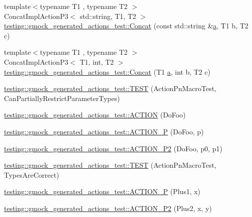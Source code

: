 \begin{DoxyCompactItemize}
\item 
{\footnotesize template$<$typename T1 , typename T2 $>$ }\\Concat\+Impl\+Action\+P3$<$ std\+::string, T1, T2 $>$ \hyperlink{namespacetesting_1_1gmock__generated__actions__test_a28213583d5450876b564a3df58d1cf91}{testing\+::gmock\+\_\+generated\+\_\+actions\+\_\+test\+::\+Concat} (const std\+::string \&\hyperlink{_07copy_08_2_read_camera_model_8m_a551a3d351eadcc0b9b1a2f24f0fb5ea0}{a}, T1 b, T2 c)
\item 
{\footnotesize template$<$typename T1 , typename T2 $>$ }\\Concat\+Impl\+Action\+P3$<$ T1, int, T2 $>$ \hyperlink{namespacetesting_1_1gmock__generated__actions__test_a861e9fadbecf0c66e8226021c6c22013}{testing\+::gmock\+\_\+generated\+\_\+actions\+\_\+test\+::\+Concat} (T1 \hyperlink{_07copy_08_2_read_camera_model_8m_a551a3d351eadcc0b9b1a2f24f0fb5ea0}{a}, int b, T2 c)
\item 
\hyperlink{namespacetesting_1_1gmock__generated__actions__test_a7222610b197216e7976b3fa751f97daf}{testing\+::gmock\+\_\+generated\+\_\+actions\+\_\+test\+::\+T\+E\+ST} (Action\+Pn\+Macro\+Test, Can\+Partially\+Restrict\+Parameter\+Types)
\item 
\hyperlink{namespacetesting_1_1gmock__generated__actions__test_a183b3863b3c2319ac414fe694455f58c}{testing\+::gmock\+\_\+generated\+\_\+actions\+\_\+test\+::\+A\+C\+T\+I\+ON} (Do\+Foo)
\item 
\hyperlink{namespacetesting_1_1gmock__generated__actions__test_a8487a3396f4f705e134e44584634ef1c}{testing\+::gmock\+\_\+generated\+\_\+actions\+\_\+test\+::\+A\+C\+T\+I\+O\+N\+\_\+P} (Do\+Foo, p)
\item 
\hyperlink{namespacetesting_1_1gmock__generated__actions__test_acd38e742235e154ad309f22e9a470a86}{testing\+::gmock\+\_\+generated\+\_\+actions\+\_\+test\+::\+A\+C\+T\+I\+O\+N\+\_\+\+P2} (Do\+Foo, p0, p1)
\item 
\hyperlink{namespacetesting_1_1gmock__generated__actions__test_ad702feced8b71b3708782b1a2274453e}{testing\+::gmock\+\_\+generated\+\_\+actions\+\_\+test\+::\+T\+E\+ST} (Action\+Pn\+Macro\+Test, Types\+Are\+Correct)
\item 
\hyperlink{namespacetesting_1_1gmock__generated__actions__test_a89c01b82e854ad79e3d139aa72477747}{testing\+::gmock\+\_\+generated\+\_\+actions\+\_\+test\+::\+A\+C\+T\+I\+O\+N\+\_\+P} (Plus1, x)
\item 
\hyperlink{namespacetesting_1_1gmock__generated__actions__test_a0e2768c0fae30bc46ec6e322b29dd54c}{testing\+::gmock\+\_\+generated\+\_\+actions\+\_\+test\+::\+A\+C\+T\+I\+O\+N\+\_\+\+P2} (Plus2, x, y)

\end{DoxyCompactItemize}
